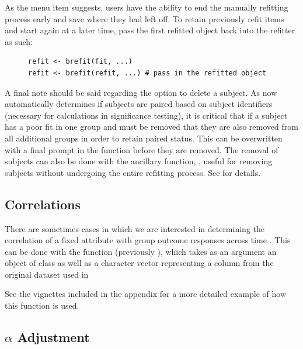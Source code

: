 As the menu item suggests, users have the ability to end the manually refitting process early and save where they had left off. To retain previously refit items and start again at a later time, pass the first refitted object back into the refitter as such:

\begin{singlespace}
\begin{figure}[H]
\centering
\begin{BVerbatim}
refit <- brefit(fit, ...)
refit <- brefit(refit, ...) # pass in the refitted object
\end{BVerbatim}
\end{figure}
\end{singlespace}



A final note should be said regarding the option to delete a subject. As  now automatically determines if subjects are paired based on subject identifiers (necessary for  calculations in significance testing), it is critical that if a subject has a poor fit in one group and must be removed that they are also removed from all additional groups in order to retain paired status. This can be overwritten with a final prompt in the  function before they are removed. The removal of subjects can also be done with the ancillary function, , useful for removing subjects without undergoing the entire refitting process. See  for details.


\subsection{Correlations}

There are sometimes cases in which we are interested in determining the correlation of a fixed attribute with group outcome responses across time . This can be done with the  function (previously ), which takes as an argument an object of class  as well as a character vector representing a column from the original dataset used in 

\begin{center}
\end{center}

See the vignettes included in the appendix for a more detailed example of how this function is used.

\subsection{$\alpha$ Adjustment}


